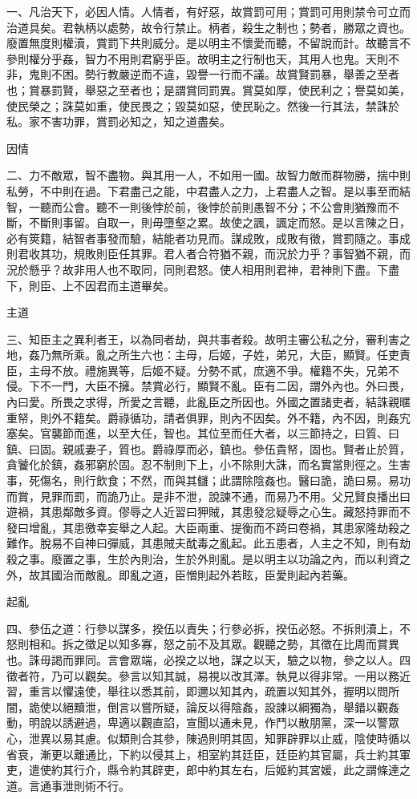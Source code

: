 
\begin{pinyinscope}
一、凡治天下，必因人情。人情者，有好惡，故賞罰可用；賞罰可用則禁令可立而治道具矣。君執柄以處勢，故令行禁止。柄者，殺生之制也；勢者，勝眾之資也。廢置無度則權瀆，賞罰下共則威分。是以明主不懷愛而聽，不留說而計。故聽言不參則權分乎姦，智力不用則君窮乎臣。故明主之行制也天，其用人也鬼。天則不非，鬼則不困。勢行教嚴逆而不違，毀譽一行而不議。故賞賢罰暴，舉善之至者也；賞暴罰賢，舉惡之至者也；是謂賞同罰異。賞莫如厚，使民利之；譽莫如美，使民榮之；誅莫如重，使民畏之；毀莫如惡，使民恥之。然後一行其法，禁誅於私。家不害功罪，賞罰必知之，知之道盡矣。

因情

二、力不敵眾，智不盡物。與其用一人，不如用一國。故智力敵而群物勝，揣中則私勞，不中則在過。下君盡己之能，中君盡人之力，上君盡人之智。是以事至而結智，一聽而公會。聽不一則後悖於前，後悖於前則愚智不分；不公會則猶豫而不斷，不斷則事留。自取一，則毋墮壑之累。故使之諷，諷定而怒。是以言陳之日，必有筴籍，結智者事發而驗，結能者功見而。謀成敗，成敗有徵，賞罰隨之。事成則君收其功，規敗則臣任其罪。君人者合符猶不親，而況於力乎？事智猶不親，而況於懸乎？故非用人也不取同，同則君怒。使人相用則君神，君神則下盡。下盡下，則臣、上不因君而主道畢矣。

主道

三、知臣主之異利者王，以為同者劫，與共事者殺。故明主審公私之分，審利害之地，姦乃無所乘。亂之所生六也：主母，后姬，子姓，弟兄，大臣，顯賢。任吏責臣，主母不放。禮施異等，后姬不疑。分勢不貳，庶適不爭。權籍不失，兄弟不侵。下不一門，大臣不擁。禁賞必行，顯賢不亂。臣有二因，謂外內也。外曰畏，內曰愛。所畏之求得，所愛之言聽，此亂臣之所因也。外國之置諸吏者，結誅親暱重帑，則外不籍矣。爵祿循功，請者俱罪，則內不因矣。外不籍，內不因，則姦宄塞矣。官襲節而進，以至大任，智也。其位至而任大者，以三節持之，曰質、曰鎮、曰固。親戚妻子，質也。爵祿厚而必，鎮也。參伍貴帑，固也。賢者止於質，貪饕化於鎮，姦邪窮於固。忍不制則下上，小不除則大誅，而名實當則徑之。生害事，死傷名，則行飲食；不然，而與其讎；此謂除陰姦也。醫曰詭，詭曰易。易功而賞，見罪而罰，而詭乃止。是非不泄，說諫不通，而易乃不用。父兄賢良播出曰遊禍，其患鄰敵多資。僇辱之人近習曰狎賊，其患發忿疑辱之心生。藏怒持罪而不發曰增亂，其患徼幸妄舉之人起。大臣兩重、提衡而不踦曰卷禍，其患家隆劫殺之難作。脫易不自神曰彈威，其患賊夫酖毒之亂起。此五患者，人主之不知，則有劫殺之事。廢置之事，生於內則治，生於外則亂。是以明主以功論之內，而以利資之外，故其國治而敵亂。即亂之道，臣憎則起外若眩，臣愛則起內若藥。

起亂

四、參伍之道：行參以謀多，揆伍以責失；行參必拆，揆伍必怒。不拆則瀆上，不怒則相和。拆之徵足以知多寡，怒之前不及其眾。觀聽之勢，其徵在比周而賞異也。誅毋謁而罪同。言會眾端，必揆之以地，謀之以天，驗之以物，參之以人。四徵者符，乃可以觀矣。參言以知其誠，易視以改其澤。執見以得非常。一用以務近習，重言以懼遠使，舉往以悉其前，即邇以知其內，疏置以知其外，握明以問所闇，詭使以絕黷泄，倒言以嘗所疑，論反以得陰姦，設諫以綱獨為，舉錯以觀姦動，明說以誘避過，卑適以觀直諂，宣聞以通未見，作鬥以散朋黨，深一以警眾心，泄異以易其慮。似類則合其參，陳過則明其固，知罪辟罪以止威，陰使時循以省衰，漸更以離通比，下約以侵其上，相室約其廷臣，廷臣約其官屬，兵士約其軍吏，遣使約其行介，縣令約其辟吏，郎中約其左右，后姬約其宮媛，此之謂條達之道。言通事泄則術不行。


\end{pinyinscope}
